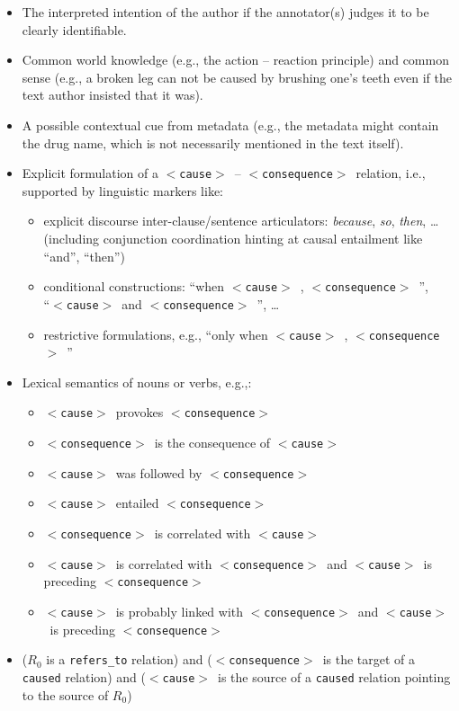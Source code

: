 \documentclass[12pt]{article}
\theoremstyle{definition}
\newcommand{\cause}{$<$\texttt{cause}$>$\ }
\newcommand{\conseq}{$<$\texttt{consequence}$>$\ }
\begin{document}
\begin{itemize}
    \item The interpreted intention of the author if the annotator(s) judges it to be clearly identifiable.
    \item Common world knowledge (e.g., the action -- reaction principle) and common sense (e.g., a broken leg can not be caused by brushing one's teeth even if the text author insisted that it was).
    \item A possible contextual cue from metadata (e.g., the metadata might contain the drug name, which is not necessarily mentioned in the text itself).
    \item Explicit formulation of a \cause-- \conseq relation, i.e., supported by linguistic markers like:
    \begin{itemize}
        \item explicit discourse inter-clause/sentence articulators: \textit{because}, \textit{so}, \textit{then}, \ldots (including conjunction coordination hinting at  causal entailment like ``and'', ``then'') %
        \item conditional constructions: ``when \cause , \conseq'',  \\ ``\cause and \conseq'', \ldots
        \item restrictive formulations, e.g., ``only when \cause , \conseq''
    \end{itemize}
    \item Lexical semantics of nouns or verbs, e.g.,:
    \begin{itemize}
        \item \cause  provokes \conseq
        \item \conseq is the consequence of \cause
        \item \cause was followed by \conseq
        \item \cause entailed \conseq
        \item \conseq is correlated with \cause
        \item \cause is correlated with \conseq and \cause is preceding \conseq
        \item \cause is probably linked with \conseq and \cause is preceding \conseq
    \end{itemize}
    \item ($R_0$ is a \texttt{refers\_to} relation) and (\conseq is the target of a \texttt{caused} relation) and (\cause is the source of a \texttt{caused} relation pointing  to the source of $R_0$) 

\end{itemize}
\end{document}
